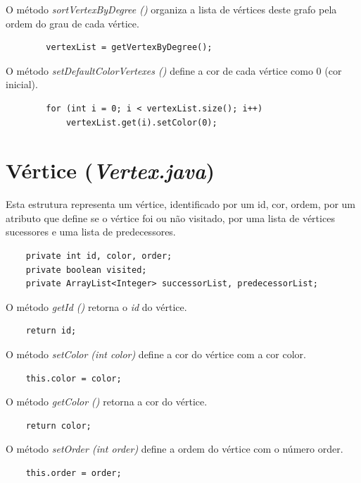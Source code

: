 \documentclass[a4paper,12pt]{report}
\begin{document}
O método \textit{sortVertexByDegree ()} organiza a lista de vértices deste grafo pela ordem do grau de cada vértice.

\begin{lstlisting}
        vertexList = getVertexByDegree();
\end{lstlisting}

O método \textit{setDefaultColorVertexes ()} define a cor de cada vértice como 0 (cor inicial).

\begin{lstlisting}
        for (int i = 0; i < vertexList.size(); i++)
            vertexList.get(i).setColor(0);
\end{lstlisting}

\section{Vértice (\textit{Vertex.java})}\label{vertex}

Esta estrutura representa um vértice, identificado por um id, cor, ordem, por um atributo que define se o vértice foi ou não visitado, por uma lista de vértices sucessores e uma lista de predecessores.

\begin{lstlisting}
    private int id, color, order;
    private boolean visited;
    private ArrayList<Integer> successorList, predecessorList;
\end{lstlisting}

O método \textit{getId ()} retorna o \textit{id} do vértice.

\begin{lstlisting}
    return id;
\end{lstlisting}

O método \textit{setColor (int color)} define a cor do vértice com a cor color.

\begin{lstlisting}
    this.color = color;
\end{lstlisting}

O método \textit{getColor ()} retorna a cor do vértice.

\begin{lstlisting}
    return color;
\end{lstlisting}

O método \textit{setOrder (int order)} define a ordem do vértice com o número order.

\begin{lstlisting}
    this.order = order;
\end{lstlisting}
\end{document}
